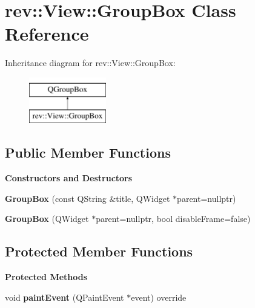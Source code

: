 \hypertarget{classrev_1_1_view_1_1_group_box}{}\section{rev\+::View\+::Group\+Box Class Reference}
\label{classrev_1_1_view_1_1_group_box}
Inheritance diagram for rev\+::View\+::Group\+Box\+:\begin{figure}[H]
\begin{center}
\leavevmode
\includegraphics[height=2.000000cm]{classrev_1_1_view_1_1_group_box}
\end{center}
\end{figure}
\subsection*{Public Member Functions}
\begin{Indent}\textbf{ Constructors and Destructors}\par
\begin{DoxyCompactItemize}
\item 
\mbox{\label{classrev_1_1_view_1_1_group_box_aced5a8c96d9e9bd930e8117a71b6da48}} 
{\bfseries Group\+Box} (const Q\+String \&title, Q\+Widget $\ast$parent=nullptr)
\item 
\mbox{\label{classrev_1_1_view_1_1_group_box_a6705e7b270efb5aa9e8c6d1317e88102}} 
{\bfseries Group\+Box} (Q\+Widget $\ast$parent=nullptr, bool disable\+Frame=false)
\end{DoxyCompactItemize}
\end{Indent}
\subsection*{Protected Member Functions}
\begin{Indent}\textbf{ Protected Methods}\par
\begin{DoxyCompactItemize}
\item 
\mbox{\label{classrev_1_1_view_1_1_group_box_a3224d99dbad6fb9b72c27b81320488f2}} 
void {\bfseries paint\+Event} (Q\+Paint\+Event $\ast$event) override
\end{DoxyCompactItemize}
\end{Indent}
